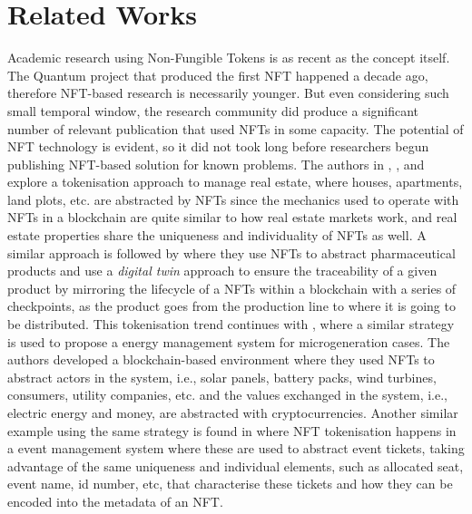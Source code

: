 \documentclass[../access.tex]{subfiles}
\begin{document}
\section{Related Works}
\label{sec:related_works}
Academic research using Non-Fungible Tokens is as recent as the concept itself. The Quantum project that produced the first NFT happened a decade ago, therefore NFT-based research is necessarily younger. But even considering such small temporal window, the research community did produce a significant number of relevant publication that used NFTs in some capacity. The potential of NFT technology is evident, so it did not took long before researchers begun publishing NFT-based solution for known problems. The authors in \cite{Hung2023}, \cite{Barbuta2024}, and \cite{Sharma2024} explore a tokenisation approach to manage real estate, where houses, apartments, land plots, etc. are abstracted by NFTs since the mechanics used to operate with NFTs in a blockchain are quite similar to how real estate markets work, and real estate properties share the uniqueness and individuality of NFTs as well. A similar approach is followed by \cite{Chiacchio2022} where they use NFTs to abstract pharmaceutical products and use a \textit{digital twin} approach to ensure the traceability of a given product by mirroring the lifecycle of a NFTs within a blockchain with a series of checkpoints, as the product goes from the production line to where it is going to be distributed. This tokenisation trend continues with \cite{Karandikar2021}, where a similar strategy is used to propose a energy management system for microgeneration cases. The authors developed a blockchain-based environment where they used NFTs to abstract actors in the system, i.e., solar panels, battery packs, wind turbines, consumers, utility companies, etc. and the values exchanged in the system, i.e., electric energy and money, are abstracted with cryptocurrencies. Another similar example using the same strategy is found in \cite{Regner2019} where NFT tokenisation happens in a event management system where these are used to abstract event tickets, taking advantage of the same uniqueness and individual elements, such as allocated seat, event name, id number, etc, that characterise these tickets and how they can be encoded into the metadata of an NFT.
\par
\end{document}
